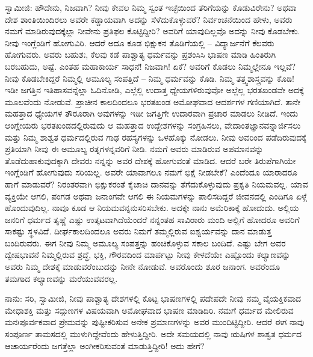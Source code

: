 ಸ್ವಾಮೀಜಿ: ಹೌದೇನು, ನಿಜವಾಗಿ? ನೀವು ಕೇವಲ ನಿಮ್ಮ ಸ್ವಂತ ಇಚ್ಛೆಯಿಂದ ತೆರಿಗೆಯನ್ನು ಕೊಡುವಿರೇನು? ಅಥವಾ ದೇಶ ಶಾಂತಿಯಿಂದಿರಲು ಅವರೇ ಕಡ್ಡಾಯವಾಗಿ ಅದನ್ನು ಸೆಳೆದುಕೊಳ್ಳುವರೆ? ನಿರ್ವಂಚನೆಯಿಂದ ಹೇಳು, ಅವರು ನಮಗೆ ಮಾಡಿರುವುದಕ್ಕೆಲ್ಲಾ ನೀವೇನು ಪ್ರತಿಫಲ ಕೊಟ್ಟಿದ್ದೀರಿ? ಅವರಿಗೆ ಯಾವುದಿಲ್ಲವೊ ಅದನ್ನು ನೀವು ಕೊಡಬೇಕು. ನೀವು ಇಂಗ್ಲೆಂಡಿಗೆ ಹೋಗುವಿರಿ. ಆದರೆ ಅದೂ ಕೂಡ ಭಿಕ್ಷುಕನ ತೊಡಿಗೆಯಲ್ಲಿ – ವಿದ್ಯಾರ್ಜನೆಗೆ ಕೆಲವರು ಹೋಗುವರು. ಅವರು ಬಹುಶಃ, ಕೆಲವು ಕಡೆ ಪಾಶ್ಚಾತ್ಯ ಧರ್ಮವನ್ನು ಪ್ರಶಂಸಿಸಿ ಭಾಷಣ ಮಾಡಿ ಹಿಂತಿರುಗಿ ಬರಬಹುದು, ಅಷ್ಟೆ. ಎಂತಹ ಮಹಾಕಾರ್ಯ ಸಾಧನೆ! ನಿಜವಾಗಿ! ಏಕೆ? ಅವರಿಗೆ ಕೊಡಲು ನಿಮ್ಮಲ್ಲೇನೂ ಇಲ್ಲವೆ? ನೀವು ಕೊಡಬೇಕಿದ್ದರೆ ನಿಮ್ಮಲ್ಲಿ ಅಮೂಲ್ಯ ಸಂಪತ್ತಿದೆ – ನಿಮ್ಮ ಧರ್ಮವನ್ನು ಕೊಡಿ. ನಿಮ್ಮ ತತ್ತ್ವಶಾಸ್ತ್ರವನ್ನು ಕೊಡಿ! ಇಡೀ ಜಗತ್ತಿನ ಇತಿಹಾಸವನ್ನೆಲ್ಲಾ ಓದಿನೋಡಿ, ಎಲ್ಲೆಲ್ಲಿ ಉದಾತ್ತ ಧ್ಯೇಯಗಳಿರುವುವೋ ಅಲ್ಲೆಲ್ಲ ಭರತಖಂಡವೇ ಅದಕ್ಕೆ ಮೂಲವೆಂದು ನೋಡುವೆ. ಪ್ರಾಚೀನ ಕಾಲದಿಂದಲೂ ಭರತಖಂಡ ಅಮೋಘವಾದ ಆದರ್ಶಗಳ ಗಣಿಯಾಗಿದೆ. ತಾನೇ ಮಹತ್ತಾದ ಧ್ಯೇಯಗಳ ತೌರೂರಾಗಿ ಅವುಗಳನ್ನು ಇಡೀ ಜಗತ್ತಿಗೇ ಉದಾರವಾಗಿ ಪ್ರಚಾರ ಮಾಡಲು ನೀಡಿದೆ. ಇಂದು ಆಂಗ್ಲೇಯರು ಭರತಖಂಡದಲ್ಲಿರುವುದು ಆ ಮಹತ್ತಾದ ಉದ್ದೇಶಗಳನ್ನು ಸಂಗ್ರಹಿಸಲು, ವೇದಾಂತಜ್ಞಾನವನ್ನಾರ್ಜಿಸಲು ಮತ್ತು ನಿಮ್ಮ ಶಾಶ್ವತ ಧರ್ಮದಲ್ಲಿರುವ ಗಾಢ ರಹಸ್ಯಗಳನ್ನು ಒಳಹೊಕ್ಕು ನೋಡಲು. ನೀವು ಅವರಿಂದ ಪಡೆದಿರುವುದಕ್ಕೆ ಪ್ರತಿಯಾಗಿ ನೀವು ಈ ಅಮೂಲ್ಯ ರತ್ನಗಳನ್ನವರಿಗೆ ನೀಡಿ. ನಮಗೆ ಅವರು ಮಾಡಿರುವ ಅಪಮಾನವನ್ನು ತೊಡೆದುಹಾಕುವುದಕ್ಕಾಗಿ ದೇವರು ನನ್ನನ್ನು ಅವರ ದೇಶಕ್ಕೆ ಹೋಗುವಂತೆ ಮಾಡಿದ. ಆದರೆ ಬರೇ ತಿರುಪೆಗಾಗಿಯೇ ಇಂಗ್ಲೆಂಡಿಗೆ ಹೋಗುವುದು ಸರಿಯಲ್ಲ. ಅವರೇ ಯಾವಾಗಲೂ ನಮಗೆ ಭಿಕ್ಷೆ ನೀಡಬೇಕೆ? ಎಂದೆಂದೂ ಯಾರಾದರೂ ಹಾಗೆ ಮಾಡುವರೆ? ನಿರಂತರವಾಗಿ ಭಿಕ್ಷುಕರಂತೆ ಕೈಚಾಚಿ ದಾನವನ್ನು ತೆಗೆದುಕೊಳ್ಳುವುದು ಪ್ರಕೃತಿ ನಿಯಮವಲ್ಲ. ಯಾವ ವ್ಯಕ್ತಿಯೇ ಆಗಲಿ, ಪಂಗಡ ಅಥವಾ ಜನಾಂಗವೇ ಆಗಲಿ ಈ ನಿಯಮಗಳನ್ನು ಪಾಲಿಸದಿದ್ದರೆ ಜೀವನದಲ್ಲಿ ಎಂದಿಗೂ ಏಳ್ಗೆ ಹೊಂದುವುದಿಲ್ಲ. ನಾವೂ ಕೂಡ ಆ ನಿಯಮವನ್ನನುಸರಿಸಬೇಕು. ಅದಕ್ಕೇ ನಾನು ಅಮೆರಿಕಾಕ್ಕೆ ಹೋದುದು. ಅಲ್ಲಿಯ ಜನರಿಗೆ ಧರ್ಮದ ತೃಷ್ಣೆ ಎಷ್ಟು ಉತ್ಕಟವಾಗಿದೆಯೆಂದರೆ ನನ್ನಂತಹ ಸಾವಿರಾರು ಮಂದಿ ಅಲ್ಲಿಗೆ ಹೋದರೂ ಅವರಿಗೆ ಸಾಕಷ್ಟು ಸ್ಥಳವಿದೆ. ದೀರ್ಘಕಾಲದಿಂದಲೂ ಅವರು ನಿಮಗೆ ತಮ್ಮಲ್ಲಿರುವ ಐಶ್ವರ್ಯವನ್ನು ದಾನ ಮಾಡುತ್ತ ಬಂದಿರುವರು. ಈಗ ನೀವು ನಿಮ್ಮ ಅಮೂಲ್ಯ ಸಂಪತ್ತನ್ನು ಹಂಚಿಕೊಳ್ಳುವ ಸಕಾಲ ಬಂದಿದೆ. ಎಷ್ಟು ಬೇಗ ಅವರ ದ್ವೇಷಭಾವನೆ ನಿಮ್ಮಲ್ಲಿರುವ ಶ್ರದ್ಧೆ, ಭಕ್ತಿ, ಗೌರವದಿಂದ ಮಾರ್ಪಟ್ಟು ನೀವು ಕೇಳದೆಯೇ ಎಷ್ಟೊಂದು ಕಲ್ಯಾಣವನ್ನು ಅವರು ನಿಮ್ಮ ದೇಶಕ್ಕೆ ಮಾಡುವರೆಂಬುದನ್ನು ನೀನೇ ನೋಡುವೆ. ಅವರೊಂದು ಶೂರ ಜನಾಂಗ. ಅವರೆಂದೂ ತಮಗಾದ ಕಲ್ಯಾಣವನ್ನು ಮರೆಯುವವರಲ್ಲ.

ನಾನು: ಸರಿ, ಸ್ವಾಮೀಜಿ, ನೀವು ಪಾಶ್ಚಾತ್ಯ ದೇಶಗಳಲ್ಲಿ ಕೊಟ್ಟ ಭಾಷಣಗಳಲ್ಲಿ ಪದೇಪದೇ ನೀವು ನಮ್ಮ ವೈಯಕ್ತಿಕವಾದ ಮೇಧಾಶಕ್ತಿ ಮತ್ತು ಸದ್ಗುಣಗಳ ವಿಷಯವಾಗಿ ಅಮೋಘವಾದ ಭಾಷಣ ಮಾಡಿದಿರಿ. ನಮಗೆ ಧರ್ಮದ ಮೇಲಿರುವ ಮನಃಪೂರ್ವಕವಾದ ಪ್ರೇಮವನ್ನು ಪುಷ್ಟೀಕರಿಸುವ ಅನೇಕ ಪ್ರಮಾಣಗಳನ್ನು ಅವರ ಮುಂದಿಟ್ಟಿದ್ದೀರಿ. ಆದರೆ ಈಗ ನಾವು ಸಂಪೂರ್ಣ ತಾಮಸದಲ್ಲಿ ಮುಳುಗಿದ್ದೇವೆಂದು ಹೇಳುತ್ತಿದ್ದೀರಿ. ಅದೇ ಸಮಯದಲ್ಲಿ ನಾವು ಋಷಿಗಳ ಶಾಶ್ವತ ಧರ್ಮದ ಆಚಾರ್ಯರೆಂದು ಜಗತ್ತೆಲ್ಲಾ ಅಂಗೀಕರಿಸುವಂತೆ ಮಾಡುತ್ತಿದ್ದೀರಿ! ಅದು ಹೇಗೆ?

